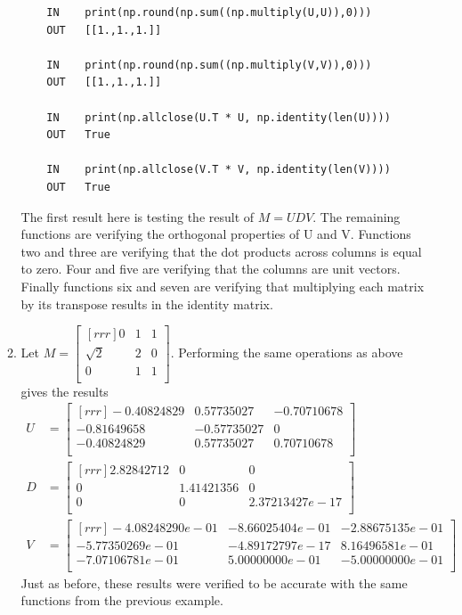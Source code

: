 \documentclass[12pt]{article}
\theoremstyle{definition}
\theoremstyle{plain}
\begin{document}
\begin{enumerate}
\begin{enumerate}
\begin{verbatim}
	IN    print(np.round(np.sum((np.multiply(U,U)),0)))
	OUT   [[1.,1.,1.]]
	
	IN    print(np.round(np.sum((np.multiply(V,V)),0)))
	OUT   [[1.,1.,1.]]
	
	IN    print(np.allclose(U.T * U, np.identity(len(U))))
	OUT   True
	
	IN    print(np.allclose(V.T * V, np.identity(len(V))))
	OUT   True
 	\end{verbatim}
 	The first result here is testing the result of $M=UDV$. The remaining functions are verifying the orthogonal properties of U and V. Functions two and three are verifying that the dot products across columns is equal to zero. Four and five are verifying that the columns are unit vectors. Finally functions six and seven are verifying that multiplying each matrix by its transpose results in the identity matrix.
	\item Let $M=\begin{bmatrix}[rrr]0&1&1\\\sqrt{2}&2&0\\0&1&1\\\end{bmatrix}$. Performing the same operations as above gives the results
	\begin{align*}
	U&=\begin{bmatrix}[rrr]-0.40824829 & 0.57735027 & -0.70710678\\
	-0.81649658 & -0.57735027 & 0\\
	-0.40824829 & 0.57735027 & 0.70710678\\\end{bmatrix}\\
	D&=\begin{bmatrix}[rrr]
	2.82842712 & 0 & 0\\
	0 & 1.41421356 & 0\\
	0 & 0 & 2.37213427e-17\\\end{bmatrix}\\
	V&=\begin{bmatrix}[rrr]
	-4.08248290e-01 & -8.66025404e-01 & -2.88675135e-01\\
	-5.77350269e-01 & -4.89172797e-17 & 8.16496581e-01\\
	-7.07106781e-01 & 5.00000000e-01 & -5.00000000e-01\\\end{bmatrix}
	\end{align*}
	Just as before, these results were verified to be accurate with the same functions from the previous example.

\end{enumerate}
\end{enumerate}
\end{document}
